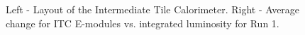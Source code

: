 \begin{figure}[htb]
\centering
{}
\quad
{}

\caption{Left - Layout of the Intermediate Tile Calorimeter. Right - Average change for ITC E-modules vs. integrated luminosity for Run 1.}\label{fig:Change_vs_Lumi}\label{fig:itc_layout_energy}
\end{figure} 

